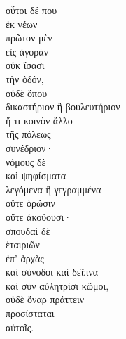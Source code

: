 {\large
\begin{greek}
\noindent οὗτοι δέ που \\
\tabto{2em} ἐκ νέων \\
πρῶτον μὲν \\
\tabto{2em} εἰς ἀγορὰν \\
οὐκ ἴσασι \\
\tabto{2em} τὴν ὁδόν, \\
οὐδὲ ὅπου \\
\tabto{2em} δικαστήριον ἢ βουλευτήριον \\
\tabto{2em} ἤ τι κοινὸν ἄλλο \\
\tabto{4em} τῆς πόλεως \\
\tabto{2em} συνέδριον· \\
νόμους δὲ \\
καὶ ψηφίσματα \\
\tabto{4em} λεγόμενα ἢ γεγραμμένα \\
\tabto{2em} οὔτε ὁρῶσιν \\
\tabto{2em} οὔτε ἀκούουσι· \\
σπουδαὶ δὲ \\
\tabto{2em} ἑταιριῶν \\
\tabto{4em} ἐπ' ἀρχὰς \\
καὶ σύνοδοι καὶ δεῖπνα \\
καὶ σὺν αὐλητρίσι κῶμοι, \\
οὐδὲ ὄναρ πράττειν \\
\tabto{2em} προσίσταται \\
\tabto{4em} αὐτοῖς.\\

\end{greek}
}

